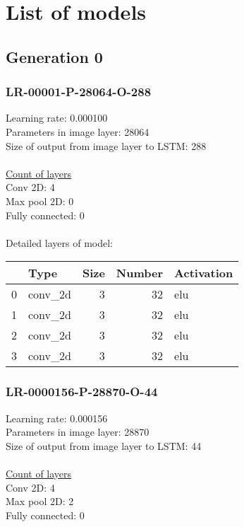 \section{List of models}
\subsection{Generation 0}
\subsubsection*{LR-00001-P-28064-O-288}
Learning rate: 0.000100
\\Parameters in image layer: 28064
\\Size of output from image layer to LSTM: 288
\\\\\underline{Count of layers} 
\\Conv 2D:           4\\Max pool 2D:      0\\Fully connected:  0
\\\\Detailed layers of model: \\\begin{tabular}{rlrrl}
\hline
    & Type    &   Size &   Number & Activation   \\
\hline
  0 & conv\_2d &      3 &       32 & elu          \\
  1 & conv\_2d &      3 &       32 & elu          \\
  2 & conv\_2d &      3 &       32 & elu          \\
  3 & conv\_2d &      3 &       32 & elu          \\
\hline
\end{tabular}\subsubsection*{LR-0000156-P-28870-O-44}
Learning rate: 0.000156
\\Parameters in image layer: 28870
\\Size of output from image layer to LSTM: 44
\\\\\underline{Count of layers} 
\\Conv 2D:           4\\Max pool 2D:      2\\Fully connected:  0
